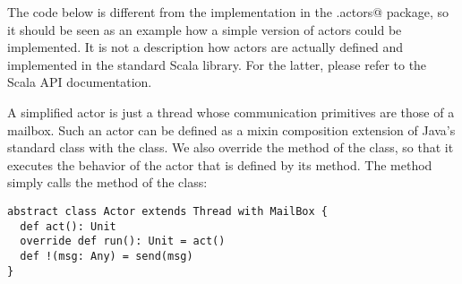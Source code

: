 The code below is different from the implementation in the \lstinline@scala.actors@
package, so it should be seen as an example how a simple version of
actors could be implemented.  It is not a description how actors are actually defined and
implemented in the standard Scala library. For the latter, please
refer to the Scala API documentation.

A simplified actor is just a thread whose communication primitives are those
of a mailbox.  Such an actor can be defined as a mixin composition
extension of Java's standard
 class with the  class. We also override
the  method of the  class, so that it executes the
behavior of the actor that is defined by its  method.
The \code{!} method simply calls the  method of the
 class:
\begin{lstlisting}
abstract class Actor extends Thread with MailBox {
  def act(): Unit
  override def run(): Unit = act()
  def !(msg: Any) = send(msg)
}
\end{lstlisting}



